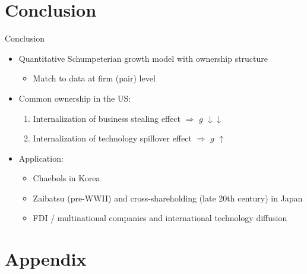 \documentclass[english,aspectratio=169,handout]{beamer}
\theoremstyle{plain}
\begin{document}
\section{Conclusion}
\begin{frame}{Conclusion}
  \begin{itemize}
    \item Quantitative Schumpeterian growth model with ownership structure
          \begin{itemize}
            \item Match to data at firm (pair) level\medskip{}
          \end{itemize}
          \medskip{}
    \item Common ownership in the US:
          \begin{enumerate}
            \item Internalization of business stealing effect $\Longrightarrow$ $g$ $\downarrow$$\downarrow$
            \item Internalization of technology spillover effect $\Longrightarrow$ $g$ $\uparrow$
          \end{enumerate}
          \medskip{}
    \item Application:
          \begin{itemize}
            \item Chaebols in Korea
            \item Zaibatsu (pre-WWII) and cross-shareholding (late 20th century) in Japan
            \item FDI / multinational companies and international technology diffusion
          \end{itemize}
  \end{itemize}
\end{frame}
\appendix

\section{Appendix}
\end{document}
